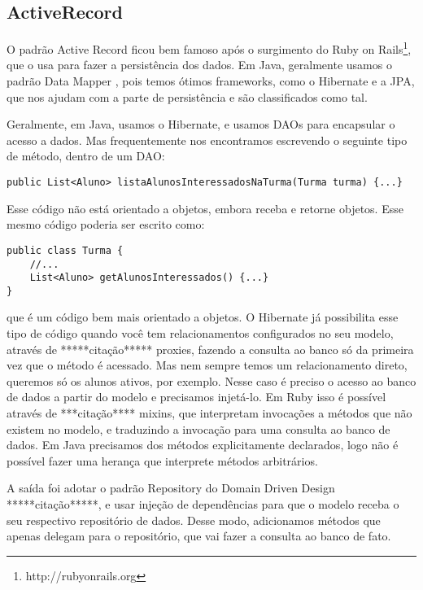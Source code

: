 \subsection{ActiveRecord}

O padrão Active Record \cite{activeRecord} ficou bem famoso após o surgimento do Ruby on Rails\footnote{http://rubyonrails.org}, que o usa 
para fazer a persistência dos dados. Em Java, geralmente usamos o padrão Data Mapper \cite{dataMapper}, pois temos 
ótimos frameworks, como o Hibernate e a JPA, que nos ajudam com a parte de persistência e são classificados como tal.

Geralmente, em Java, usamos o Hibernate, e usamos DAOs\cite{dao} para encapsular 
o acesso a dados. Mas frequentemente nos encontramos escrevendo o seguinte tipo de método, dentro de um DAO:

\begin{lstlisting}
public List<Aluno> listaAlunosInteressadosNaTurma(Turma turma) {...}
\end{lstlisting}

Esse código não está orientado a objetos, embora receba e retorne objetos. Esse mesmo código poderia ser escrito como:

\begin{lstlisting}
public class Turma {
	//...
	List<Aluno> getAlunosInteressados() {...}
}
\end{lstlisting}

que é um código bem mais orientado a objetos. O Hibernate já possibilita esse tipo de código quando você
tem relacionamentos configurados no seu modelo, através de *****citação***** proxies, fazendo a consulta ao banco
só da primeira vez que o método é acessado. Mas nem sempre temos um relacionamento direto, queremos só os alunos
ativos, por exemplo. Nesse caso é preciso o acesso ao banco de dados a partir do modelo e precisamos injetá-lo.
Em Ruby isso é possível através de ***citação**** mixins, que interpretam invocações a métodos que não existem no
modelo, e traduzindo a invocação para uma consulta ao banco de dados. Em Java precisamos dos métodos explicitamente
declarados, logo não é possível fazer uma herança que interprete métodos arbitrários.

A saída foi adotar o padrão Repository do Domain Driven Design *****citação*****, e usar injeção de dependências para
que o modelo receba o seu respectivo repositório de dados. Desse modo, adicionamos métodos que apenas delegam para o
repositório, que vai fazer a consulta ao banco de fato.

